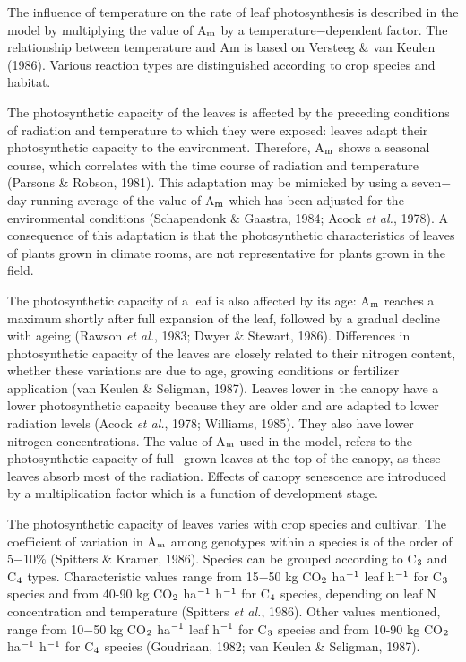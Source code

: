 The influence of temperature on the rate of leaf photosynthesis is described in the model by multiplying the value of A$_{{\rm m}}$ by a temperature$-$dependent factor. The relationship between temperature and Am is based on Versteeg \& van Keulen (1986). Various reaction types are distinguished according to crop species and habitat.

The photosynthetic capacity of the leaves is affected by the preceding conditions of radiation and temperature to which they were exposed: leaves adapt their photosynthetic capacity to the environment. Therefore, A$_{{\rm m}}$ shows a seasonal course, which correlates with the time course of radiation and temperature (Parsons \& Robson, 1981). This adaptation may be mimicked by using a seven$-$day running average of the value of A$_{{\rm m}}$ which has been adjusted for the environmental conditions (Schapendonk \& Gaastra, 1984; Acock {\it et al.}, 1978). A consequence of this adaptation is that the photosynthetic  characteristics of leaves of plants grown in climate rooms, are not representative for plants grown in the field.

The photosynthetic capacity of a leaf is also affected by its age: A$_{{\rm m}}$ reaches a maximum shortly after full expansion of the leaf, followed by a gradual decline with ageing (Rawson {\it et al.}, 1983; Dwyer \& Stewart, 1986). Differences in photosynthetic capacity of the leaves are closely related to their nitrogen content, whether these variations are due to age, growing conditions or fertilizer application (van Keulen \& Seligman, 1987). Leaves lower in the canopy have a lower photosynthetic capacity because they are older and are adapted to lower radiation levels (Acock {\it et al.}, 1978; Williams, 1985). They also have lower nitrogen concentrations. The value of A$_{{\rm m}}$ used in the model, refers to the photosynthetic capacity of full$-$grown leaves at the top of the canopy, as these leaves absorb most of the radiation. Effects of canopy senescence are introduced by a multiplication  factor which is a function of development stage.

The photosynthetic capacity of leaves varies with crop species and cultivar. The coefficient of variation in A$_{{\rm m}}$ among genotypes within a species is of the order of 5$-$10\% (Spitters \& Kramer, 1986). Species can be grouped according to C$_{{\rm 3}}$ and C$_{{\rm 4}}$ types. Characteristic values range from 15$-$50 kg CO$_{{\rm 2}}$ ha$^{{\rm -}{1}}$ leaf h$^{{\rm -}{1}}$ for C$_{{\rm 3}}$ species and from 40-90
kg CO$_{{\rm 2}}$ ha$^{{\rm -1}}$ h$^{{\rm -1}}$ for C$_{{\rm 4}}$ species, depending on leaf N concentration and temperature (Spitters {\it et al.}, 1986). Other values mentioned, range from 10$-$50 kg CO$_{{\rm 2}}$ ha$^{{\rm -}{1}}$ leaf h$^{{\rm -}{1}}$ for C$_{{\rm 3}}$ species and from 10-90 kg CO$_{{\rm 2}}$ ha$^{{\rm -1}}$ h$^{{\rm -1}}$ for C$_{{\rm 4}}$ species (Goudriaan, 1982; van Keulen \&
Seligman, 1987). 

